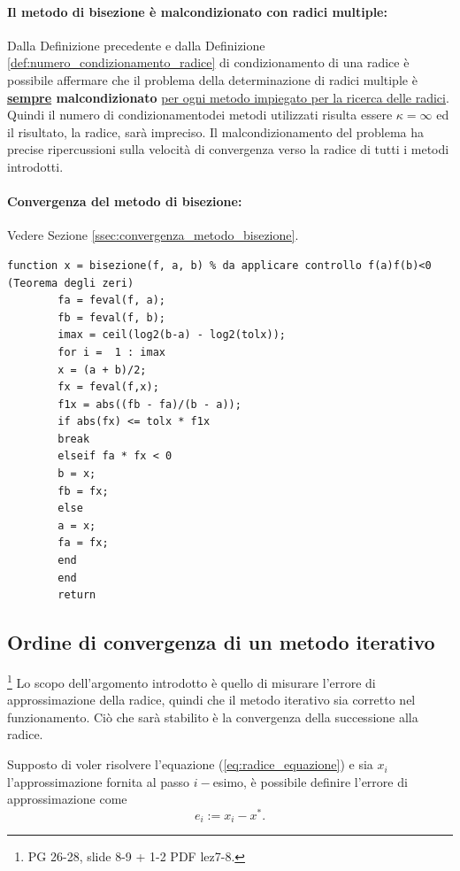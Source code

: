 \paragraph{Il metodo di bisezione è malcondizionato con radici multiple:} Dalla Definizione precedente e dalla Definizione \ref{def:numero_condizionamento_radice} di condizionamento di una radice è possibile affermare che il problema della determinazione di radici multiple è \textbf{\underline{sempre} malcondizionato} \uline{per ogni metodo impiegato per la ricerca delle radici}. Quindi  il numero di condizionamentodei metodi utilizzati risulta essere $\kappa=\infty$ ed il risultato, la radice, sarà impreciso. Il malcondizionamento del problema ha precise ripercussioni sulla velocità di convergenza verso la radice di tutti i metodi introdotti.

\paragraph{Convergenza del metodo di bisezione:} Vedere Sezione \ref{ssec:convergenza_metodo_bisezione}.

\begin{algorithm}\caption{Implementazione ottimale del metodo di bisezione.}
	\label{alg:metodo_bisezione}
	\begin{lstlisting}[style=Matlab-editor]
		function x = bisezione(f, a, b) % da applicare controllo f(a)f(b)<0 (Teorema degli zeri)
		fa = feval(f, a);
		fb = feval(f, b);
		imax = ceil(log2(b-a) - log2(tolx));
		for i =  1 : imax
		x = (a + b)/2;
		fx = feval(f,x);
		f1x = abs((fb - fa)/(b - a));
		if abs(fx) <= tolx * f1x
		break
		elseif fa * fx < 0
		b = x;
		fb = fx;
		else
		a = x;
		fa = fx;
		end
		end
		return
	\end{lstlisting}
\end{algorithm}

\subsection{Ordine di convergenza di un metodo iterativo}\footnote{PG 26-28, slide 8-9 + 1-2 PDF lez7-8.} Lo scopo dell'argomento introdotto è quello di misurare l'errore di approssimazione della radice, quindi che il metodo iterativo sia corretto nel funzionamento. Ciò che sarà stabilito è la convergenza della successione alla radice.
\begin{definition}
	Supposto di voler risolvere l'equazione (\ref{eq:radice_equazione}) e sia $x_i$ l'approssimazione fornita al passo $i-$esimo, è possibile definire l'errore di approssimazione come
	\begin{equation}\label{eq:errore_metodo_iterativo}
		e_i:=x_i-x^*.
	\end{equation}
\end{definition} 

